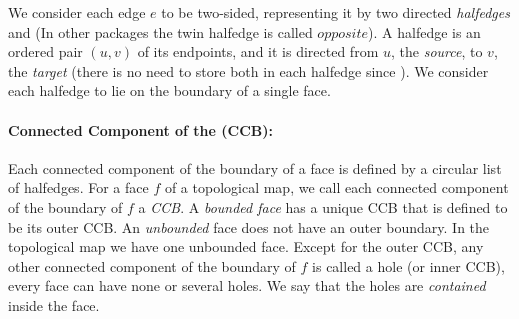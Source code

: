 We consider each edge $e$ to be two-sided, representing it by two
directed {\em halfedges}  and 
(In other packages the twin halfedge is called $opposite$).  
A halfedge  is an ordered pair $(u,v)$ of its endpoints, and
it is directed from $u$, the {\em source}, to $v$, the {\em target} (there 
is no need to store both in each halfedge since 
%
).
We consider each halfedge to lie on the boundary of a single face.



\paragraph{Connected Component of the  (CCB):}
Each connected component of the boundary of a face is %
defined by a
circular list of halfedges. 
For a face $f$ of a topological map, 
we call each
connected component of the boundary of $f$ a {\em CCB}.
A {\em bounded face} has a
unique CCB that is defined to be
its outer CCB. An
{\em unbounded\/} face does not have an outer boundary.
In the topological map we have one unbounded face.
Except for the outer CCB, any other
connected component of the boundary of $f$ is called a hole (or inner CCB),
every face can have none
or several holes.
We say that the holes are {\em contained\/} inside
the face.

